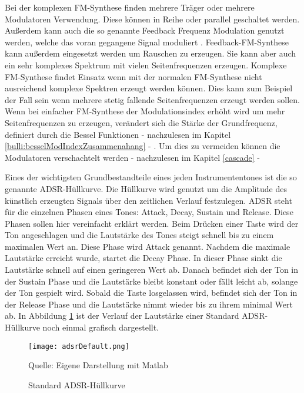 Bei der komplexen FM-Synthese finden mehrere Träger oder mehrere Modulatoren Verwendung. Diese können in Reihe oder parallel geschaltet werden. Außerdem kann auch die so genannte Feedback Frequenz Modulation genutzt werden, welche das voran gegangene Signal moduliert \cite[S. 399 f.]{hornerPaper}. Feedback-FM-Synthese kann außerdem eingesetzt werden um Rauschen zu erzeugen. Sie kann aber auch ein sehr komplexes Spektrum mit vielen Seitenfrequenzen erzeugen. Komplexe FM-Synthese findet Einsatz wenn mit der normalen FM-Synthese nicht ausreichend komplexe Spektren erzeugt werden können. Dies kann zum Beispiel der Fall sein wenn mehrere stetig fallende Seitenfrequenzen erzeugt werden sollen. Wenn bei einfacher FM-Synthese der Modulationsindex erhöht wird um mehr Seitenfrequenzen zu erzeugen, verändert sich die Stärke der Grundfrequenz, definiert durch die Bessel Funktionen - nachzulesen im Kapitel \ref{bulli:besselModIndexZusammenahang} - . Um dies zu vermeiden können die Modulatoren verschachtelt werden - nachzulesen im Kapitel \ref{cascade} - 

Eines der wichtigsten Grundbestandteile eines jeden Instrumententones ist die so genannte ADSR-Hüllkurve. Die Hüllkurve wird genutzt um die Amplitude des künstlich erzeugten Signals über den zeitlichen Verlauf festzulegen. ADSR steht für die einzelnen Phasen eines Tones: Attack, Decay, Sustain und Release. Diese Phasen sollen hier vereinfacht erklärt werden. Beim Drücken einer Taste wird der Ton angeschlagen und die Lautstärke des Tones steigt schnell bis zu einem maximalen Wert an. Diese Phase wird Attack genannt. Nachdem die maximale Lautstärke erreicht wurde, startet die Decay Phase. In dieser Phase sinkt die Lautstärke schnell auf einen geringeren Wert ab. Danach befindet sich der Ton in der Sustain Phase und die Lautstärke bleibt konstant oder fällt leicht ab, solange der Ton gespielt wird. Sobald die Taste losgelassen wird, befindet sich der Ton in der Release Phase und die Lautstärke nimmt wieder bis zu ihrem minimal Wert ab. In Abbildung \ref{fig:adsrDefault} ist der Verlauf der Lautstärke einer Standard ADSR-Hüllkurve noch einmal grafisch dargestellt.

\begin{figure} [ht]
\centering
  \texttt{[image: adsrDefault.png]}
\caption{Standard ADSR-Hüllkurve}
\label{fig:adsrDefault}
Quelle: Eigene Darstellung mit Matlab
\end{figure}

